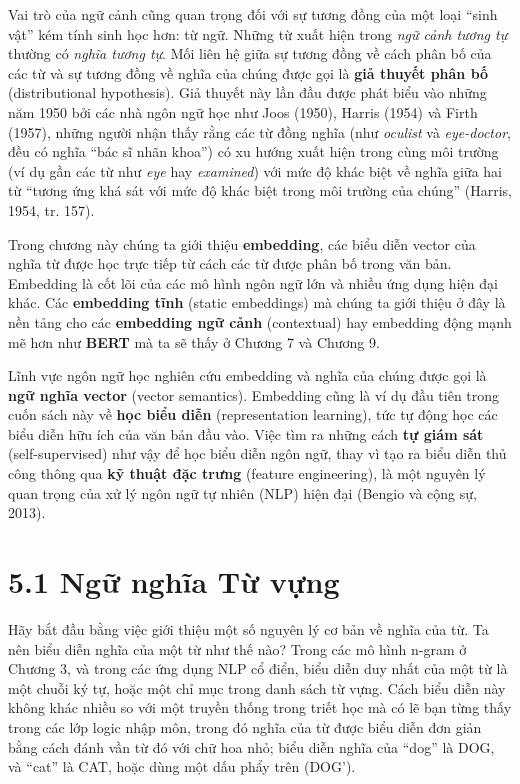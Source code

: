 Vai trò của ngữ cảnh cũng quan trọng đối với sự tương đồng của một loại ``sinh vật'' kém tính sinh học hơn: từ ngữ. Những từ xuất hiện trong \emph{ngữ cảnh tương tự} thường có \emph{nghĩa tương tự}. Mối liên hệ giữa sự tương đồng về cách phân bố của các từ và sự tương đồng về nghĩa của chúng được gọi là \textbf{giả thuyết phân bố} (distributional hypothesis). Giả thuyết này lần đầu được phát biểu vào những năm 1950 bởi các nhà ngôn ngữ học như Joos (1950), Harris (1954) và Firth (1957), những người nhận thấy rằng các từ đồng nghĩa (như \emph{oculist} và \emph{eye-doctor}, đều có nghĩa ``bác sĩ nhãn khoa'') có xu hướng xuất hiện trong cùng môi trường (ví dụ gần các từ như \emph{eye} hay \emph{examined}) với mức độ khác biệt về nghĩa giữa hai từ ``tương ứng khá sát với mức độ khác biệt trong môi trường của chúng'' (Harris, 1954, tr. 157).

Trong chương này chúng ta giới thiệu \textbf{embedding}, các biểu diễn vector của nghĩa từ được học trực tiếp từ cách các từ được phân bố trong văn bản. Embedding là cốt lõi của các mô hình ngôn ngữ lớn và nhiều ứng dụng hiện đại khác. Các \textbf{embedding tĩnh} (static embeddings) mà chúng ta giới thiệu ở đây là nền tảng cho các \textbf{embedding ngữ cảnh} (contextual) hay embedding động mạnh mẽ hơn như \textbf{BERT} mà ta sẽ thấy ở Chương 7 và Chương 9.

Lĩnh vực ngôn ngữ học nghiên cứu embedding và nghĩa của chúng được gọi là \textbf{ngữ nghĩa vector} (vector semantics). Embedding cũng là ví dụ đầu tiên trong cuốn sách này về \textbf{học biểu diễn} (representation learning), tức tự động học các biểu diễn hữu ích của văn bản đầu vào. Việc tìm ra những cách \textbf{tự giám sát} (self-supervised) như vậy để học biểu diễn ngôn ngữ, thay vì tạo ra biểu diễn thủ công thông qua \textbf{kỹ thuật đặc trưng} (feature engineering), là một nguyên lý quan trọng của xử lý ngôn ngữ tự nhiên (NLP) hiện đại (Bengio và cộng sự, 2013).

\section{5.1 Ngữ nghĩa Từ vựng}

Hãy bắt đầu bằng việc giới thiệu một số nguyên lý cơ bản về nghĩa của từ. Ta nên biểu diễn nghĩa của một từ như thế nào? Trong các mô hình n-gram ở Chương 3, và trong các ứng dụng NLP cổ điển, biểu diễn duy nhất của một từ là một chuỗi ký tự, hoặc một chỉ mục trong danh sách từ vựng. Cách biểu diễn này không khác nhiều so với một truyền thống trong triết học mà có lẽ bạn từng thấy trong các lớp logic nhập môn, trong đó nghĩa của từ được biểu diễn đơn giản bằng cách đánh vần từ đó với chữ hoa nhỏ; biểu diễn nghĩa của ``dog'' là DOG, và ``cat'' là CAT, hoặc dùng một dấu phẩy trên (DOG').

